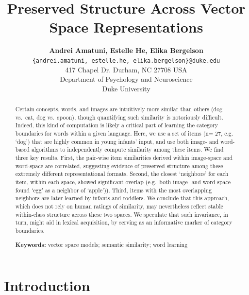 \documentclass[10pt, letterpaper]{article}
\title{Preserved Structure Across Vector Space Representations}
\author{{\large \bf Andrei Amatuni, Estelle He, Elika Bergelson} \\ \texttt{\{andrei.amatuni, estelle.he, elika.bergelson\}@duke.edu} \\ 417 Chapel Dr. Durham, NC 27708 USA \\ Department of Psychology and Neuroscience \\ Duke University}
\begin{document}
\maketitle

\begin{abstract}
Certain concepts, words, and images are intuitively more similar than
others (dog vs.~cat, dog vs.~spoon), though quantifying such similarity
is notoriously difficult. Indeed, this kind of computation is likely a
critical part of learning the category boundaries for words within a
given language. Here, we use a set of items (n= 27, e.g. `dog') that are
highly common in young infants' input, and use both image- and
word-based algorithms to independently compute similarity among these
items. We find three key results. First, the pair-wise item similarities
derived within image-space and word-space are correlated, suggesting
evidence of preserved structure among these extremely different
representational formats. Second, the closest `neighbors' for each item,
within each space, showed significant overlap (e.g.~both image- and
word-space found `egg' as a neighbor of `apple')). Third, items with the
most overlapping neighbors are later-learned by infants and toddlers. We
conclude that this approach, which does not rely on human ratings of
similarity, may nevertheless reflect stable within-class structure
across these two spaces. We speculate that such invariance, in turn,
might aid in lexical acquisition, by serving as an informative marker of
category boundaries.

\textbf{Keywords:}
vector space models; semantic similarity; word learning
\end{abstract}

\section{Introduction}\label{introduction}
\end{document}
